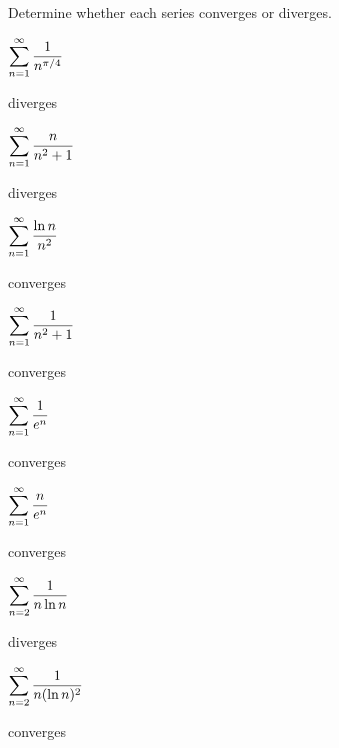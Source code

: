 \begin{exercises}

Determine whether each series converges or diverges.

\twocol

\begin{exercise} $\displaystyle\sum_{n=1}^\infty {1\over n^{\pi/4}}$
\begin{answer} diverges
\end{answer}\end{exercise}

\begin{exercise} $\displaystyle\sum_{n=1}^\infty {n\over n^2+1}$
\begin{answer} diverges
\end{answer}\end{exercise}

\begin{exercise} $\displaystyle\sum_{n=1}^\infty {\ln n\over n^2}$
\begin{answer} converges
\end{answer}\end{exercise}

\begin{exercise} $\displaystyle\sum_{n=1}^\infty {1\over n^2+1}$
\begin{answer} converges
\end{answer}\end{exercise}

\begin{exercise} $\displaystyle\sum_{n=1}^\infty {1\over e^n}$
\begin{answer} converges
\end{answer}\end{exercise}

\begin{exercise} $\displaystyle\sum_{n=1}^\infty {n\over e^n}$
\begin{answer} converges
\end{answer}\end{exercise}

\begin{exercise} $\displaystyle\sum_{n=2}^\infty {1\over n\ln n}$
\begin{answer} diverges
\end{answer}\end{exercise}

\begin{exercise} $\displaystyle\sum_{n=2}^\infty {1\over n(\ln n)^2}$
\begin{answer} converges
\end{answer}\end{exercise}


\end{exercises}
